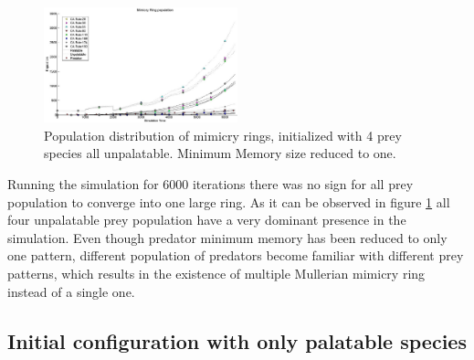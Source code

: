 \documentclass[letterpaper]{article}
\numberwithin{equation}{section}
\begin{document}
\begin{figure}[H]
	\centering
	\includegraphics[width=0.5\textwidth]{../tex/images/simTime6k-4Prey-unp-1-mem}
	\caption[Population distribution of mimicry rings(4 prey, all unpalatable but reduced predator memory)]{Population distribution of mimicry rings, initialized with 4 prey species all unpalatable. Minimum Memory size reduced to one.}
	\label{fig:plot-4-prey-unp-1-mem}
\end{figure}

Running the simulation for 6000 iterations there was no sign for all prey population to converge into one large ring. As it can be observed in figure \ref{fig:plot-4-prey-unp-1-mem} all four unpalatable prey population have a very dominant presence in the simulation. Even though predator minimum memory has been reduced to only one pattern, different population of predators become familiar with different prey patterns, which results in the existence of multiple Mullerian mimicry ring instead of a single one.

\subsection{Initial configuration with only palatable species}
\label{subsec:init-only-palatable-species}
\end{document}
